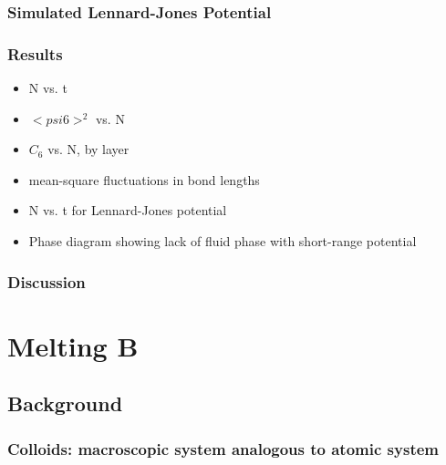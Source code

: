 \documentclass{umthesis}          %
\begin{document}
\subsection{Simulated Lennard-Jones Potential}
\label{sec-2.3.5}

\subsection{Results}
\label{sec-2.3.6}

\begin{itemize}

\item N vs. t\\
\label{sec-2.3.6.1}


\item $< psi6 >^2$ vs. N\\
\label{sec-2.3.6.2}


\item $C_6$ vs. N, by layer\\
\label{sec-2.3.6.3}


\item mean-square fluctuations in bond lengths\\
\label{sec-2.3.6.4}


\item N vs. t for Lennard-Jones potential\\
\label{sec-2.3.6.5}


\item Phase diagram showing lack of fluid phase with short-range potential\\
\label{sec-2.3.6.6}

\end{itemize} %
\subsection{Discussion}
\label{sec-2.3.7}

\chapter{Melting B}
\label{sec-3}

\section{Background}
\label{sec-3.1}

\subsection{Colloids: macroscopic system analogous to atomic system}
\label{sec-3.1.1}
\end{document}

